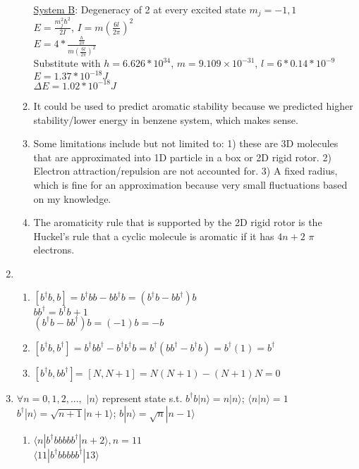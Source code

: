 \documentclass{article}
\begin{document}
\begin{enumerate}
\begin{enumerate}
    \\ \underline{System B}: Degeneracy of 2 at every excited state $m_j=-1,1$
    \\ $E=\frac{m_j^2\hbar^2}{2I}$, $I=m(\frac{6l}{2\pi})^2$
    \\ $E=4*\frac{\frac{h}{2\pi}}{m(\frac{6l}{2\pi})^2}$
    \\ Substitute with $h=6.626*10^{34}$, $m=9.109 × 10^{-31}$, $l=6*0.14*10^{-9}$
    \\ $E= 1.37*10^{-18} J$
    \\ $\Delta E= 1.02*10^{-18} J$
    \item It could be used to predict aromatic stability because we predicted higher stability/lower energy in benzene system, which makes sense. 
    \item Some limitations include but not limited to: 1) these are 3D molecules that are approximated into 1D particle in a box or 2D rigid rotor. 2) Electron attraction/repulsion are not accounted for. 3) A fixed radius, which is fine for an approximation because very small fluctuations based on my knowledge. 
    \item The aromaticity rule that is supported by the 2D rigid rotor is the Huckel's rule that a cyclic molecule is aromatic if it has $4n+2$ $\pi$ electrons.
    \end{enumerate}
\item 
    \begin{enumerate}
    \item $[b^\dagger b, b]= b^\dagger bb-bb^\dagger b=(b^\dagger b-bb^\dagger )b$
    \\ $bb^\dagger=b^\dagger b+1$
    \\ $(b^\dagger b-bb^\dagger )b=(-1)b=-b$
    \item $[b^\dagger b, b^\dagger]= b^\dagger bb^\dagger-b^\dagger b^\dagger b=b^\dagger(bb^\dagger-b^\dagger b)=b^\dagger(1)=b^\dagger$
    \item $[b^\dagger b, bb^\dagger]$= $[N, N+1]=N(N+1)-(N+1)N=0$
    \end{enumerate}
\item $\forall n=0,1,2,...,$ $|n\rangle$ represent state s.t. $b^\dagger b|n\rangle=n|n\rangle$; $\langle n|n\rangle=1$
\\ $b^\dagger|n\rangle=\sqrt{n+1}|n+1\rangle$; $b|n\rangle=\sqrt{n}|n-1\rangle$ 
    \begin{enumerate}
        \item $\langle n|b^\dagger bbbb b^\dagger|n+2 \rangle, n=11$
        \\ $\langle 11|b^\dagger bbbb b^\dagger|13 \rangle$

\end{enumerate}
\end{enumerate}
\end{document}
